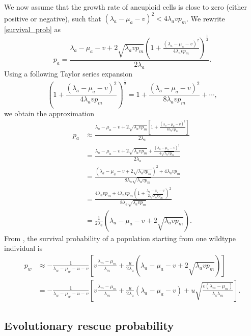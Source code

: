 \documentclass[12pt]{extarticle}
\begin{document}
We now assume that the growth rate of aneuploid cells is close to zero (either positive or negative), such that  $\left(\lambda_a-\mu_a-v\right)^2 < 4\lambda_avp_m$.
We rewrite \cref{survival_prob} as
\begin{equation}
p_a=\frac{\lambda_a-\mu_a-v+2\sqrt{\lambda_a vp_m}\left(1+\frac{\left(\lambda_a-\mu_a-v\right)^2}{4\lambda_avp_m}\right)^{\frac12}}{2\lambda_a} .
\end{equation}
Using a following Taylor series expansion
\begin{equation*}
\left(1+\frac{\left(\lambda_a-\mu_a-v\right)^2}{4\lambda_avp_m}\right)^{\frac{1}{2}}=1+\frac{\left(\lambda_a-\mu_a-v\right)^2}{8\lambda_avp_m}+\cdots,
\end{equation*}
we obtain the approximation
\begin{align*}
p_a&\approx\frac{\lambda_a-\mu_a-v+2\sqrt{\lambda_a vp_m}\left[1+\frac{\left(\lambda_a-\mu_a-v\right)^2}{8\lambda_avp_m}\right]}{2\lambda_a}\\
&=\frac{\lambda_a-\mu_a-v+2\sqrt{\lambda_a vp_m}+\frac{\left(\lambda_a-\mu_a-v\right)^2}{4\sqrt{\lambda_avp_m}}}{2\lambda_a}\\
&=\frac{\left(\lambda_a-\mu_a-v+2\sqrt{\lambda_avp_m}\right)^2+4\lambda_avp_m}{8\lambda_a\sqrt{\lambda_avp_m}}\\
&=\frac{4\lambda_avp_m+4\lambda_avp_m\left(1+\frac{\lambda_a-\mu_a-v}{2\sqrt{\lambda_avp_m}}\right)^2}{8\lambda_a\sqrt{\lambda_avp_m}}\\
&=\frac{1}{2\lambda_a}\left(\lambda_a-\mu_a-v+2\sqrt{\lambda_avp_m}\right).
\end{align*}
From , %
the survival probability of a population starting from one wildtype individual is
\begin{align}\label{scenario3}
p_w&\approx-\frac{1}{\lambda_w-\mu_w-u-v}\left[v\frac{\lambda_m-\mu_m}{\lambda_m}+\frac{u}{2\lambda_a}\left(\lambda_a-\mu_a-v+2\sqrt{\lambda_avp_m}\right)\right]\\
&=-\frac{1}{\lambda_w-\mu_w-u-v}\left[v\frac{\lambda_m-\mu_m}{\lambda_m}+\frac{u}{2\lambda_a}\left(\lambda_a-\mu_a-v\right)+u\sqrt{\frac{v\left(\lambda_m-\mu_m\right)}{\lambda_a\lambda_m}}\right].
\end{align}


\subsection*{Evolutionary rescue probability}
\end{document}
